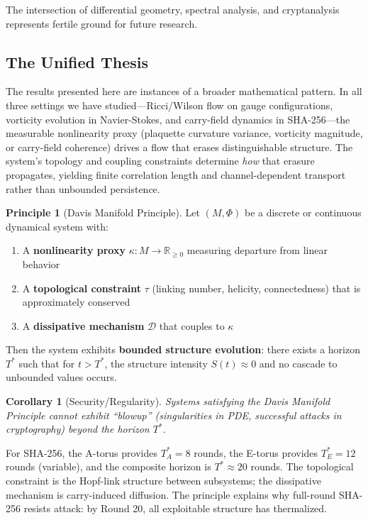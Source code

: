 \documentclass[11pt,a4paper]{article}
\theoremstyle{plain}
\newtheorem{corollary}[theorem]{Corollary}
\theoremstyle{definition}
\newtheorem{principle}[theorem]{Principle}
\theoremstyle{remark}
\begin{document}
The intersection of differential geometry, spectral analysis, and cryptanalysis represents fertile ground for future research.

\subsection{The Unified Thesis}

The results presented here are instances of a broader mathematical pattern. In all three settings we have studied---Ricci/Wilson flow on gauge configurations, vorticity evolution in Navier-Stokes, and carry-field dynamics in SHA-256---the measurable nonlinearity proxy (plaquette curvature variance, vorticity magnitude, or carry-field coherence) drives a flow that erases distinguishable structure. The system's topology and coupling constraints determine \emph{how} that erasure propagates, yielding finite correlation length and channel-dependent transport rather than unbounded persistence.

\begin{principle}[Davis Manifold Principle]
Let $(M, \Phi)$ be a discrete or continuous dynamical system with:
\begin{enumerate}
    \item A \textbf{nonlinearity proxy} $\kappa: M \to \mathbb{R}_{\geq 0}$ measuring departure from linear behavior
    \item A \textbf{topological constraint} $\tau$ (linking number, helicity, connectedness) that is approximately conserved
    \item A \textbf{dissipative mechanism} $\mathcal{D}$ that couples to $\kappa$
\end{enumerate}

Then the system exhibits \textbf{bounded structure evolution}: there exists a horizon $T^*$ such that for $t > T^*$, the structure intensity $S(t) \approx 0$ and no cascade to unbounded values occurs.
\end{principle}

\begin{corollary}[Security/Regularity]
Systems satisfying the Davis Manifold Principle cannot exhibit ``blowup'' (singularities in PDE, successful attacks in cryptography) beyond the horizon $T^*$.
\end{corollary}

For SHA-256, the A-torus provides $T^*_A = 8$ rounds, the E-torus provides $T^*_E = 12$ rounds (variable), and the composite horizon is $T^* \approx 20$ rounds. The topological constraint is the Hopf-link structure between subsystems; the dissipative mechanism is carry-induced diffusion. The principle explains why full-round SHA-256 resists attack: by Round 20, all exploitable structure has thermalized.
\end{document}
